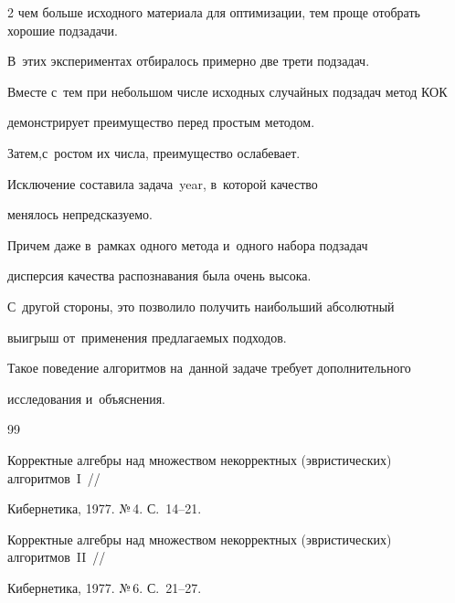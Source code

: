 \begin{multicols}{2}
чем больше исходного материала для оптимизации, тем проще отобрать хорошие подзадачи.


В~этих экспериментах отбиралось примерно две трети подзадач.








Вместе с~тем при небольшом числе исходных случайных подзадач метод КОК 


демонстрирует преимущество перед простым методом.


Затем,\linebreak с~рос\-том их числа, преимущество ослабевает.


Исключение составила задача~{year}, в~которой качество 


менялось непредсказуемо.


Причем даже в~рамках одного метода и~одного набора подзадач 


дисперсия качества распознавания была очень высока.


С~другой стороны, это позволило получить наибольший абсолютный 


выигрыш от~применения пред\-ла\-га\-емых подходов.


Такое поведение алгоритмов на~данной задаче требует дополнительного 


исследования и~объяснения.





{\small\frenchspacing


 {%




 \begin{thebibliography}{99}






{Корректные алгебры над множеством некорректных (эвристических) алгоритмов~I}~//


    Кибернетика,  1977. №\,4. С.~14--21.






{Корректные алгебры над множеством некорректных (эвристических) алгоритмов~II}~//


    Кибернетика,  1977. №\,6. С.~21--27.







\end{thebibliography}}}
\end{multicols}
